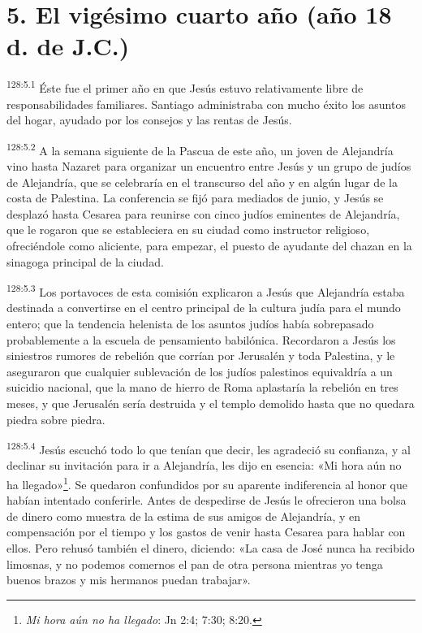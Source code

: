 \section*{5. El vigésimo cuarto año (año 18 d. de J.C.)}
\par 
\textsuperscript{128:5.1} Éste fue el primer año en que Jesús estuvo relativamente libre de responsabilidades familiares. Santiago administraba con mucho éxito los asuntos del hogar, ayudado por los consejos y las rentas de Jesús.

\par 
\textsuperscript{128:5.2} A la semana siguiente de la Pascua de este año, un joven de Alejandría vino hasta Nazaret para organizar un encuentro entre Jesús y un grupo de judíos de Alejandría, que se celebraría en el transcurso del año y en algún lugar de la costa de Palestina. La conferencia se fijó para mediados de junio, y Jesús se desplazó hasta Cesarea para reunirse con cinco judíos eminentes de Alejandría, que le rogaron que se estableciera en su ciudad como instructor religioso, ofreciéndole como aliciente, para empezar, el puesto de ayudante del chazan en la sinagoga principal de la ciudad.

\par 
\textsuperscript{128:5.3} Los portavoces de esta comisión explicaron a Jesús que Alejandría estaba destinada a convertirse en el centro principal de la cultura judía para el mundo entero; que la tendencia helenista de los asuntos judíos había sobrepasado probablemente a la escuela de pensamiento babilónica. Recordaron a Jesús los siniestros rumores de rebelión que corrían por Jerusalén y toda Palestina, y le aseguraron que cualquier sublevación de los judíos palestinos equivaldría a un suicidio nacional, que la mano de hierro de Roma aplastaría la rebelión en tres meses, y que Jerusalén sería destruida y el templo demolido hasta que no quedara piedra sobre piedra.

\par 
\textsuperscript{128:5.4} Jesús escuchó todo lo que tenían que decir, les agradeció su confianza, y al declinar su invitación para ir a Alejandría, les dijo en esencia: «Mi hora aún no ha llegado»\footnote{\textit{Mi hora aún no ha llegado}: Jn 2:4; 7:30; 8:20.}. Se quedaron confundidos por su aparente indiferencia al honor que habían intentado conferirle. Antes de despedirse de Jesús le ofrecieron una bolsa de dinero como muestra de la estima de sus amigos de Alejandría, y en compensación por el tiempo y los gastos de venir hasta Cesarea para hablar con ellos. Pero rehusó también el dinero, diciendo: «La casa de José nunca ha recibido limosnas, y no podemos comernos el pan de otra persona mientras yo tenga buenos brazos y mis hermanos puedan trabajar».

